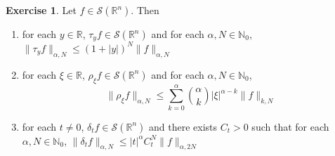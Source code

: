 \documentclass[12pt]{amsart}
\theoremstyle{definition}
\newtheorem{ex}[definition]{Exercise}
\newcommand{\al}{\alpha}
\newcommand{\del}{\delta}
\newcommand{\N}{\mathbb{N}}
\newcommand{\R}{\mathbb{R}}
\newcommand{\MS}{\mathcal{S}}
\begin{document}
	\begin{ex}
		Let $f \in \MS(\R^n)$. Then 
		\begin{enumerate}
			\item for each $y \in \R$, $\tau_y f \in \MS(\R^n)$ and for each $\al, N \in \N_0$, $\|\tau_yf\|_{\al, N} \leq (1 + |y|)^N \|f\|_{\al, N}$
			\item for each $\xi \in \R$, $\rho_{\xi} f \in \MS(\R^n)$ and for each $\al,N \in \N_0$, $$\|\rho_{\xi} f\|_{\al,N} \leq \sum\limits_{k=0}^{\al} {\al \choose k} |\xi|^{\al-k} \|f\|_{k, N}$$
			\item for each $t \neq 0$, $\del_t f \in \MS(\R^n)$ and there exists $C_t > 0$ such that for each $\al,N \in \N_0$, $\|\del_t f\|_{\al, N} \leq |t|^{\al} C_t^N\|f\|_{\al, 2N}$
		\end{enumerate}
	\end{ex}
\end{document}
